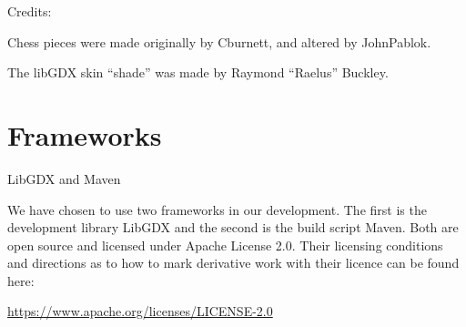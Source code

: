\documentclass[a4paper, 11pt]{article}
\begin{document}
\vspace{7mm}
\noindent
Credits:

\noindent
Chess pieces were made originally by Cburnett, and altered by JohnPablok.

\noindent
The libGDX skin “shade” was made by Raymond “Raelus” Buckley. 


\section*{Frameworks}
LibGDX and Maven

\vspace{6mm}
\noindent
We have chosen to use two frameworks in our development. The first is the development library LibGDX and the second is the build script Maven. Both are open source and licensed under Apache License 2.0. Their licensing conditions and directions as to how to mark derivative work with their licence can be found here: 

\vspace{5 mm}
\noindent
\url{https://www.apache.org/licenses/LICENSE-2.0}
\end{document}
